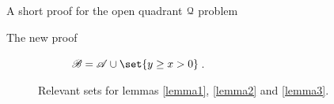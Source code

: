 \documentclass[11pt, a4paper, english, twoside, notitlepage, openright]{report}
\begin{document}
\begin{chapter}{A short proof for the open quadrant $\mathcal{Q}$ problem}
\begin{section}{The new proof}
\begin{figure}[h]
\begin{subfigure}{.5\linewidth}
\caption{$\mathscr{B} = \mathscr{A} \cup \set{y \ge x > 0}$.\label{fig:setB}}
\end{subfigure}
\caption{Relevant sets for lemmas \ref{lemma1}, \ref{lemma2} and \ref{lemma3}.\label{fig:setsAB}}
\end{figure}


\end{section}
\end{chapter}
\end{document}
